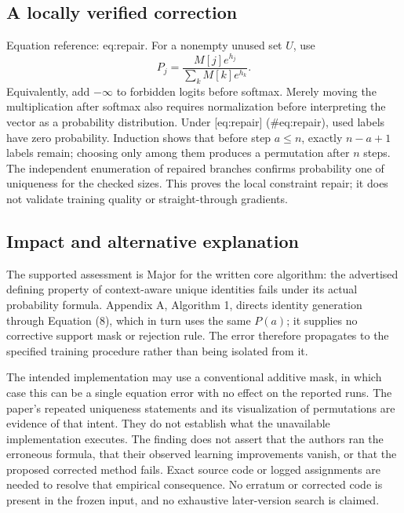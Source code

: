 \documentclass[10pt]{article}
\begin{document}
\subsection*{A locally verified correction}
Equation reference: eq:repair. For a nonempty unused set \(U\), use \[P_j=\frac{M[j]e^{h_j}}{\sum_k M[k]e^{h_k}}.\] Equivalently, add \(-\infty\) to forbidden logits before softmax. Merely moving the multiplication after softmax also requires normalization before interpreting the vector as a probability distribution. Under [eq:repair] (\#eq:repair), used labels have zero probability. Induction shows that before step \(a\leq n\), exactly \(n-a+1\) labels remain; choosing only among them produces a permutation after \(n\) steps. The independent enumeration of repaired branches confirms probability one of uniqueness for the checked sizes. This proves the local constraint repair; it does not validate training quality or straight-through gradients.\par
\subsection*{Impact and alternative explanation}
The supported assessment is Major for the written core algorithm: the advertised defining property of context-aware unique identities fails under its actual probability formula. Appendix A, Algorithm 1, directs identity generation through Equation (8), which in turn uses the same \(P(a)\); it supplies no corrective support mask or rejection rule. The error therefore propagates to the specified training procedure rather than being isolated from it.\par
The intended implementation may use a conventional additive mask, in which case this can be a single equation error with no effect on the reported runs. The paper’s repeated uniqueness statements and its visualization of permutations are evidence of that intent. They do not establish what the unavailable implementation executes. The finding does not assert that the authors ran the erroneous formula, that their observed learning improvements vanish, or that the proposed corrected method fails. Exact source code or logged assignments are needed to resolve that empirical consequence. No erratum or corrected code is present in the frozen input, and no exhaustive later-version search is claimed.\par
\end{document}
